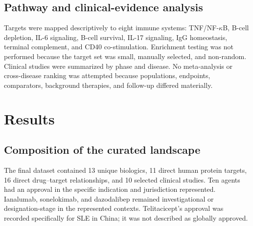 \documentclass[12pt,a4paper]{article}
\begin{document}
\subsection{Pathway and clinical-evidence analysis}
Targets were mapped descriptively to eight immune systems: TNF/NF-\(\kappa\)B, B-cell depletion, IL-6 signaling, B-cell survival, IL-17 signaling, IgG homeostasis, terminal complement, and CD40 co-stimulation. Enrichment testing was not performed because the target set was small, manually selected, and non-random. Clinical studies were summarized by phase and disease. No meta-analysis or cross-disease ranking was attempted because populations, endpoints, comparators, background therapies, and follow-up differed materially.

\section{Results}
\subsection{Composition of the curated landscape}
The final dataset contained 13 unique biologics, 11 direct human protein targets, 16 direct drug--target relationships, and 10 selected clinical studies. Ten agents had an approval in the specific indication and jurisdiction represented. Ianalumab, sonelokimab, and dazodalibep remained investigational or designation-stage in the represented contexts. Telitacicept's approval was recorded specifically for SLE in China; it was not described as globally approved.
\end{document}
